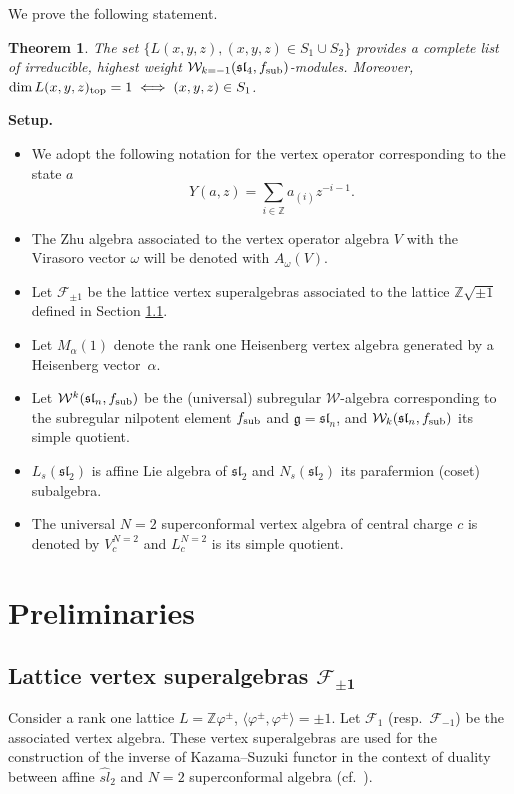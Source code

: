 \documentclass[pdftex]{sigma}
\numberwithin{equation}{section}
\newcommand{\Z}{\mathbb Z}
\newcommand{\F}{\mathcal F}
\newtheorem{Theorem}{Theorem}[section]
\begin{document}
We prove the following statement.

\begin{Theorem}
The set $\{L(x,y,z), (x,y,z) \in S_1 \cup S_2 \}$ provides a complete list of irreducible, highest weight $\mathcal{W}_{k=-1}(\mathfrak{sl}_4, f_{\rm sub})$-modules. Moreover,
$
 \dim L(x,y,z)_{\rm top} = 1 \iff (x,y,z) \in S_1$.
\end{Theorem}

{\bf Setup.}
\begin{itemize}\itemsep=0pt
	\item We adopt the following notation for the vertex operator corresponding to the state $a$
\[
Y (a, z) = \sum _{i \in \mathbb{Z}} a_{(i)}z^{-i-1}.
\]
\item The Zhu algebra associated to the vertex operator algebra $V$ with the Virasoro vector $\omega$ will be denoted with $A_{\omega}(V)$.
\item Let $\F_{\pm 1}$ be the lattice vertex {super}algebras associated to the lattice ${\mathbb Z}\sqrt{\pm 1}$ defined in Section \ref{F_{-1}}.
\item Let $M_{\alpha}(1)$ denote the rank one Heisenberg vertex algebra generated by a Heisenberg vector~$\alpha$.
\item Let $\mathcal{W}^k(\mathfrak{sl}_n, f_{\rm sub})$ be the (universal) subregular $\mathcal{W}$-algebra corresponding to the subregular nilpotent element $f_{\rm sub}$ and $\mathfrak g = \mathfrak{sl}_n$, and $\mathcal{W}_k(\mathfrak{sl}_n, f_{\rm sub})$ its simple quotient.
\item $L_s(\mathfrak{sl}_2)$ is affine Lie algebra of $\mathfrak{sl}_2$ and $N_s(\mathfrak{sl}_2)$ its parafermion (coset) subalgebra.
\item The universal $N=2$ superconformal vertex algebra of central charge $c$ is denoted by $V^{N=2}_c$ and $L^{N=2}_{c}$ is its simple quotient.
\end{itemize}

\section{Preliminaries}	

\subsection[Lattice vertex superalgebras F\_1]{ Lattice vertex superalgebras $\boldsymbol{\mathcal F_{\pm 1}}$} \label{F_{-1}}

Consider a rank one lattice $L= {\Z}\varphi^{\pm} $, $\big\langle \varphi^{\pm}, \varphi^{\pm} \big\rangle = \pm 1$. Let $\F_{1}$ (resp.\ $\F_{-1}$) be the associated vertex algebra. These vertex superalgebras are used for the construction of the inverse of Kazama--Suzuki functor in the context of duality between affine $\widehat{sl}_2$ and $N=2$ superconformal algebra (cf.\ \cite{A-IMRN,A-2001,FST}).
\end{document}
